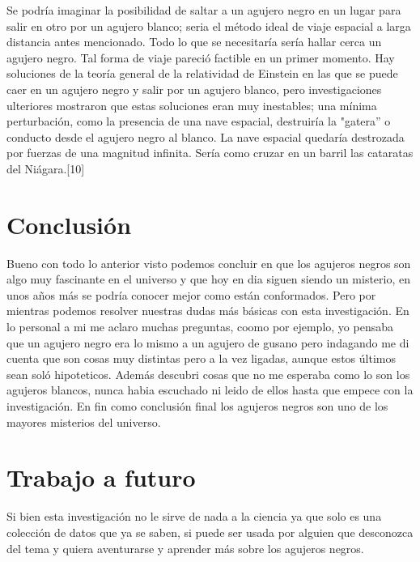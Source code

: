 \documentclass[12pt]{article}
\begin{document}
 Se podría imaginar la posibilidad de saltar a un agujero negro en un lugar para salir en otro por un agujero blanco; seria el método ideal de viaje espacial a larga distancia antes mencionado. Todo lo que se necesitaría sería hallar cerca un agujero negro. Tal forma de viaje pareció factible en un primer momento. Hay soluciones de la teoría general de la relatividad de Einstein en las que se puede caer en un agujero negro y salir por un agujero blanco, pero investigaciones ulteriores mostraron que estas soluciones eran muy inestables; una mínima perturbación, como la presencia de una nave espacial, destruiría la "gatera” o conducto desde el agujero negro al blanco. La nave espacial quedaría destrozada por fuerzas de una magnitud infinita. Sería como cruzar en un barril las cataratas del Niágara.[10]
\\%
\newpage
\section{Conclusión}
Bueno con todo lo anterior visto podemos concluir en que los agujeros negros son algo muy fascinante en el universo y que hoy en dia siguen siendo un misterio, en unos años más se podría conocer mejor como están conformados. Pero por mientras podemos resolver nuestras dudas más básicas con esta investigación. En lo personal a mi me aclaro muchas preguntas, coomo por ejemplo, yo pensaba que un agujero negro era lo mismo a un agujero de gusano pero indagando me di cuenta que son cosas muy distintas pero a la vez ligadas, aunque estos últimos sean soló hipoteticos. Además descubri cosas que no me esperaba como lo son los agujeros blancos, nunca habia escuchado ni leido de ellos hasta que empece con la investigación. En fin como conclusión final los agujeros negros son uno de los mayores misterios del universo. 
\newpage
\section{Trabajo a futuro}
Si bien esta investigación no le sirve de nada a la ciencia ya que solo es una colección de datos que ya se saben, si puede ser usada por alguien que desconozca del tema y quiera aventurarse y aprender más sobre los agujeros negros.
\newpage
\end{document}
